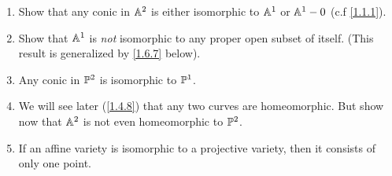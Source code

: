 \label{1.3.1}

\begin{enumerate}[label = (\alph*)]
    \item Show that any conic in $\A^2$ is either isomorphic to $\A^1$ or $\A^1 - 0$ (c.f \ref{1.1.1}).

    \item Show that $\A^1$ is \emph{not} isomorphic to any proper open subset of itself. (This result is generalized by \ref{1.6.7} below).

    \item Any conic in $\P^2$ is isomorphic to $\P^1$.

    \item We will see later (\ref{1.4.8}) that any two curves are homeomorphic. But show now that $\A^2$ is not even homeomorphic to $\P^2$.

    \item If an affine variety is isomorphic to a projective variety, then it consists of only one point.
\end{enumerate}


